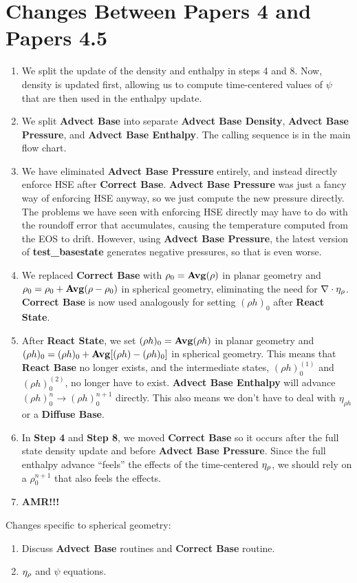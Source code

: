 \section{Changes Between Papers 4 and Papers 4.5}
\begin{enumerate}
\item We split the update of the density and enthalpy in steps 4 and 8.
Now, density is updated first, allowing us to compute time-centered values of 
$\psi$ that are then used in the enthalpy update.
\item We split {\bf Advect Base} into separate {\bf Advect Base Density},
{\bf Advect Base Pressure}, and {\bf Advect Base Enthalpy}.  The calling sequence
is in the main flow chart.
\item We have eliminated {\bf Advect Base Pressure} entirely, and instead directly
enforce HSE after {\bf Correct Base}.  {\bf Advect Base Pressure} was just a fancy
way of enforcing HSE anyway, so we just compute the new pressure directly.  The
problems we have seen with enforcing HSE directly may have to do with the roundoff
error that accumulates, causing the temperature computed from the EOS to drift.
However, using {\bf Advect Base Pressure}, the latest version of {\bf test\_basestate}
generates negative pressures, so that is even worse.
\item We replaced {\bf Correct Base} with $\rho_0 = {\rm{\bf Avg}}(\rho)$ in 
planar geometry and $\rho_0 = \rho_0 + {\rm{\bf Avg}}(\rho - \rho_0)$ in spherical geometry,
eliminating the need for $\nabla\cdot\eta_{\rho}$.  {\bf Correct Base} is now used
analogously for setting $(\rho h)_0$ after {\bf React State}.
\item After {\bf React State}, we set $(\rho h)_0 = {\rm{\bf Avg}}(\rho h)$ in 
planar geometry and $(\rho h)_0 = (\rho h)_0 + {\rm{\bf Avg}}[(\rho h) - (\rho h)_0]$ 
in spherical geometry.  This means that {\bf React Base} no longer exists, and the 
intermediate states, $(\rho h)_0^{(1)}$ and $(\rho h)_0^{(2)}$, no longer have to exist.  
{\bf Advect Base Enthalpy} will advance $(\rho h)_0^n \rightarrow (\rho h)_0^{n+1}$ 
directly.  This also means we don't have to deal with $\eta_{\rho h}$ or a 
{\bf Diffuse Base}.
\item In {\bf Step 4} and {\bf Step 8}, we moved {\bf Correct Base} so it
occurs after the full state density update and  before {\bf Advect Base Pressure}.  
Since the full enthalpy advance ``feels'' the effects of the time-centered $\eta_{\rho}$, 
we should rely on a $\rho_0^{n+1}$ that also feels the effects.
\item {\bf AMR!!!}
\end{enumerate}
Changes specific to spherical geometry:
\begin{enumerate}
\item Discuss {\bf Advect Base} routines and {\bf Correct Base} routine.
\item $\eta_{\rho}$ and $\psi$ equations.
\end{enumerate}
